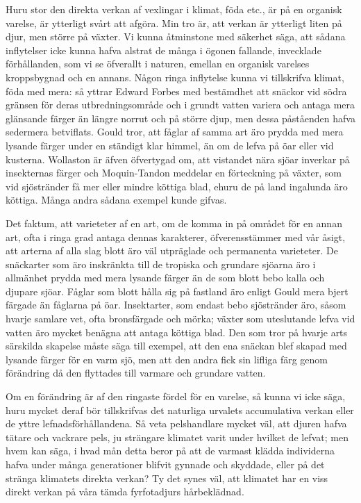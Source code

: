 Huru stor den direkta verkan af vexlingar i klimat, föda etc., är på en organisk varelse, är ytterligt svårt att afgöra. Min tro är, att verkan är ytterligt liten på djur, men större på växter. Vi kunna åtminstone med säkerhet säga, att sådana inflytelser icke kunna hafva alstrat de många i ögonen fallande, invecklade förhållanden, som vi se öfverallt i naturen, emellan en organisk varelses kroppsbygnad och en annans. Någon ringa inflytelse kunna vi tillskrifva klimat, föda med mera: så yttrar Edward Forbes med bestämdhet att snäckor vid södra gränsen för deras utbredningsområde och i grundt vatten variera och antaga mera glänsande färger än längre norrut och på större djup, men dessa påståenden hafva sedermera betviflats. Gould tror, att fåglar af samma art äro prydda med mera lysande färger under en ständigt klar himmel, än om de lefva på öar eller vid kusterna. Wollaston är äfven öfvertygad om, att vistandet nära sjöar inverkar på insekternas färger och Moquin-Tandon meddelar en förteckning på växter, som vid sjöstränder få mer eller mindre köttiga blad, ehuru de på land ingalunda äro köttiga. Många andra sådana exempel kunde gifvas.

Det faktum, att varieteter af en art, om de komma in på området för en annan art, ofta i ringa grad antaga dennas karakterer, öfverensstämmer med vår åsigt, att arterna af alla slag blott äro väl utpräglade och permanenta varieteter. De snäckarter som äro inskränkta till de tropiska och grundare sjöarna äro i allmänhet prydda med mera lysande färger än de som blott bebo kalla och djupare sjöar. Fåglar som blott hålla sig på fastland äro enligt Gould mera bjert färgade än fåglarna på öar. Insektarter, som endast bebo sjöstränder äro, såsom hvarje samlare vet, ofta bronsfärgade och mörka; växter som uteslutande lefva vid vatten äro mycket benägna att antaga köttiga blad. Den som tror på hvarje arts särskilda skapelse måste säga till exempel, att den ena snäckan blef skapad med lysande färger för en varm sjö, men att den andra fick sin lifliga färg genom förändring då den flyttades till varmare och grundare vatten.

Om en förändring är af den ringaste fördel för en varelse, så kunna vi icke säga, huru mycket deraf bör tillskrifvas det naturliga urvalets accumulativa verkan eller de yttre lefnadsförhållandena. Så veta pelshandlare mycket väl, att djuren hafva tätare och vackrare pels, ju strängare klimatet varit under hvilket de lefvat; men hvem kan säga, i hvad mån detta beror på att de varmast klädda individerna hafva under många generationer blifvit gynnade och skyddade, eller på det stränga klimatets direkta verkan? Ty det synes väl, att klimatet har en viss direkt verkan på våra tämda fyrfotadjurs hårbeklädnad.

